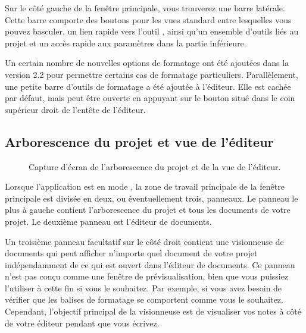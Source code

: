 \documentclass[a4paper,11pt,french]{sphinxmanual}
\begin{document}
\sphinxAtStartPar
Sur le côté gauche de la fenêtre principale, vous trouverez une barre latérale. Cette barre comporte des boutons pour les vues standard entre lesquelles vous pouvez basculer, un lien rapide vers l’outil , ainsi qu’un ensemble d’outils liés au projet et un accès rapide aux paramètres dans la partie inférieure.

\sphinxAtStartPar
{}Un certain nombre de nouvelles options de formatage ont été ajoutées dans la version 2.2 pour permettre certains cas de formatage particuliers. Parallèlement, une petite barre d’outils de formatage a été ajoutée à l’éditeur. Elle est cachée par défaut, mais peut être ouverte en appuyant sur le bouton situé dans le coin supérieur droit de l’en\sphinxhyphen{}tête de l’éditeur.


\subsection{Arborescence du projet et vue de l’éditeur}
\label{\detokenize{usage_breakdown:project-tree-and-editor-view}}
\begin{figure}[htbp]
\centering
\capstart

\noindent{}
\caption{Capture d’écran de l’arborescence du projet et de la vue de l’éditeur.}\label{\detokenize{usage_breakdown:id1}}\end{figure}

\sphinxAtStartPar
Lorsque l’application est en mode , la zone de travail principale de la fenêtre principale est divisée en deux, ou éventuellement trois, panneaux. Le panneau le plus à gauche contient l’arborescence du projet et tous les documents de votre projet. Le deuxième panneau est l’éditeur de documents.

\sphinxAtStartPar
Un troisième panneau facultatif sur le côté droit contient une visionneuse de documents qui peut afficher n’importe quel document de votre projet indépendamment de ce qui est ouvert dans l’éditeur de documents. Ce panneau n’est pas conçu comme une fenêtre de prévisualisation, bien que vous puissiez l’utiliser à cette fin si vous le souhaitez. Par exemple, si vous avez besoin de vérifier que les balises de formatage se comportent comme vous le souhaitez. Cependant, l’objectif principal de la visionneuse est de visualiser vos notes à côté de votre éditeur pendant que vous écrivez.
\end{document}
